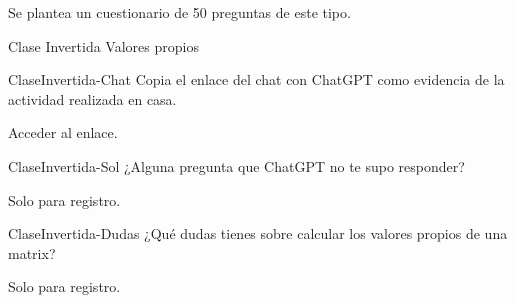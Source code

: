 \documentclass[a4,11pt]{aleph-notas}
\begin{document}
Se plantea un cuestionario de 50 preguntas de este tipo.

\begin{quiz}{Clase Invertida Valores propios}
    
\begin{essay}[response format=text, response field lines=5]%
    {ClaseInvertida-Chat}
    Copia el enlace del chat con ChatGPT como evidencia de la actividad realizada en casa.
    \item Acceder al enlace.
\end{essay}

\begin{essay}[response format=text, response field lines=5]%
    {ClaseInvertida-Sol}
    ¿Alguna pregunta que ChatGPT no te supo responder?
    \item Solo para registro.
\end{essay}

\begin{essay}[response format=text, response field lines=5]%
    {ClaseInvertida-Dudas}
    ¿Qué dudas tienes sobre calcular los valores propios de una matrix?
    \item Solo para registro.
\end{essay}



\end{quiz}
\end{document}
